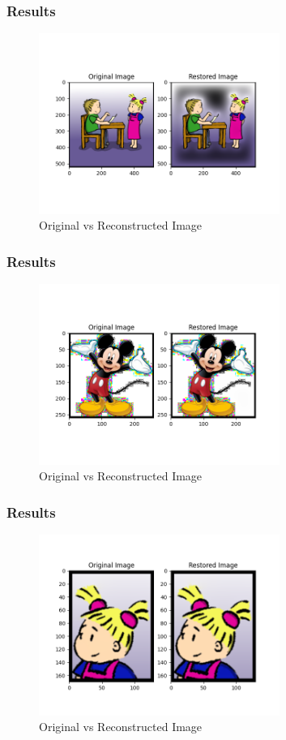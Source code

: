 \documentclass[Serif, 10pt, brown]{beamer}
\theoremstyle{example}
\theoremstyle{plain}
\begin{document}
\begin{frame}
	\frametitle{Results}
	\begin{figure}
		\centering
		\includegraphics[width=0.7\textwidth]{../results/try_11_1.png}
		\caption{Original vs Reconstructed Image}
	\end{figure}
\end{frame}


\begin{frame}
	\frametitle{Results}
	\begin{figure}
		\centering
		\includegraphics[width=0.7\textwidth]{../results/try_11_2.png}
		\caption{Original vs Reconstructed Image}
	\end{figure}
\end{frame}


\begin{frame}
	\frametitle{Results}
	\begin{figure}
		\centering
		\includegraphics[width=0.7\textwidth]{../results/try_11_3.png}
		\caption{Original vs Reconstructed Image}
	\end{figure}
\end{frame}
\end{document}
